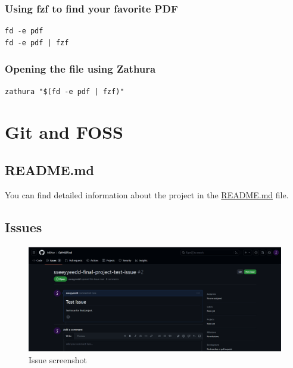 \documentclass[titlepage]{article}
\begin{document}
\subsubsection{Using fzf to find your favorite PDF}
\begin{verbatim}
fd -e pdf
fd -e pdf | fzf
\end{verbatim}
\subsubsection{Opening the file using Zathura}
\begin{verbatim}
zathura "$(fd -e pdf | fzf)"
\end{verbatim}
\newpage
\section{Git and FOSS}
\subsection{README.md}
You can find detailed information about the project in the \href{https://github.com/sseeyyeedd/CW-Final-Project/blob/main/README.md}{README.md} file.

\subsection{Issues}
\begin{figure}[ht]
    \centering
    \includegraphics[width=1\textwidth]{s.png}
    \caption{Issue screenshot}
\end{figure}
\end{document}
